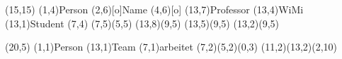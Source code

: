 \documentclass[11pt,a4paper]{article}
\begin{document}
\setlength{\unitlength}{.6cm}
\begin{schema}(15,15)
  \entity(1,4){Person}
  \attr(2,6)[o]{Name}
  \attr(4,6)[o]{}
  \relation(13,7){Professor}
  \relation(13,4){WiMi}
  \relation(13,1){Student}
  \cluster(7,4)
  \connection(7,5)(5,5){}
  \connection(13,8)(9,5){}
  \connection(13,5)(9,5){}
  \connection(13,2)(9,5){}
\end{schema}


\begin{schema}(20,5)
  \entity(1,1){Person}
  \entity(13,1){Team}
  \relation(7,1){arbeitet}
  \connection(7,2)(5,2){(0,3)}
  \connection(11,2)(13,2){(2,10)}
\end{schema}
\end{document}
